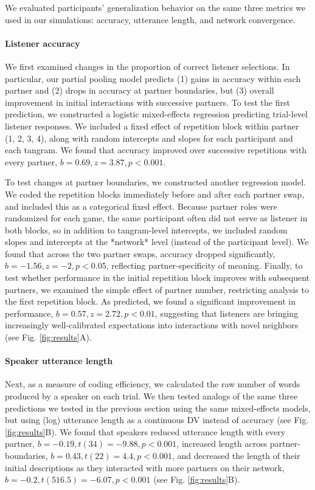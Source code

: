 We evaluated participants' generalization behavior on the same three metrics we used in our simulations: accuracy, utterance length, and network convergence.

\paragraph{Listener accuracy}

We first examined changes in the proportion of correct listener selections.
In particular, our partial pooling model predicts (1) gains in accuracy within each partner and (2) drops in accuracy at partner boundaries, but (3) overall improvement in initial interactions with successive partners.
To test the first prediction, we constructed a logistic mixed-effects regression predicting trial-level listener responses. 
We included a fixed effect of repetition block within partner (1, 2, 3, 4), along with random intercepts and slopes for each participant and each tangram. 
We found that accuracy improved over successive repetitions with every partner, $b=0.69,z=3.87, p<0.001$.

To test changes at partner boundaries, we constructed another regression model.
We coded the repetition blocks immediately before and after each partner swap, and included this as a categorical fixed effect.
Because partner roles were randomized for each game, the same participant often did not serve as listener in both blocks, so in addition to tangram-level intercepts, we included random slopes and intercepts at the *network* level (instead of the participant level).
We found that across the two partner swaps, accuracy dropped significantly, $b = -1.56, z = -2, p < 0.05$, reflecting partner-specificity of meaning.
Finally, to test whether performance in the initial repetition block improves with subsequent partners, we examined the simple effect of partner number, restricting analysis to the first repetition block.
As predicted, we found a significant improvement in performance, $b = 0.57, z = 2.72, p < 0.01$, suggesting that listeners are bringing increasingly well-calibrated expectations into interactions with novel neighbors (see Fig. \ref{fig:results}A).


\paragraph{Speaker utterance length}

Next, as a measure of coding efficiency, we calculated the raw number of words produced by a speaker on each trial.
We then tested analogs of the same three predictions we tested in the previous section using the same mixed-effects models, but using (log) utterance length as a continuous DV instead of accuracy (see Fig. \ref{fig:results}B).
We found that speakers reduced utterance length with every partner, $b = -0.19, t(34) = -9.88, p < 0.001$, increased length across partner-boundaries, $b = 0.43, t(22) = 4.4, p < 0.001$, and decreased the length of their initial descriptions as they interacted with more partners on their network, $b = -0.2, t(516.5) = -6.07, p < 0.001$ (see Fig. \ref{fig:results}B).

